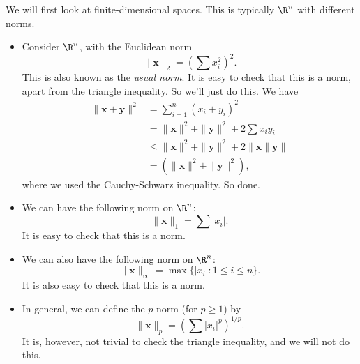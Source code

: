 \documentclass[a4paper]{article}
\begin{document}
\begin{eg}
  We will first look at finite-dimensional spaces. This is typically $\R^n$ with different norms.
  \begin{itemize}
    \item Consider $\R^n$, with the Euclidean norm
      \[
        \|\mathbf{x}\|_2 = \left(\sum x_i^2\right)^2.
      \]
      This is also known as the \emph{usual norm}. It is easy to check that this is a norm, apart from the triangle inequality. So we'll just do this. We have
      \begin{align*}
        \|\mathbf{x} + \mathbf{y}\|^2 &= \sum_{i = 1}^n (x_i + y_i)^2 \\
        &= \|\mathbf{x}\|^2 + \|\mathbf{y}\|^2 + 2\sum x_i y_i \\
        &\leq \|\mathbf{x}\|^2 + \|\mathbf{y}\|^2 + 2\|\mathbf{x}\|\mathbf{y}\| \\
        &= (\|\mathbf{x}\|^2 + \|\mathbf{y}\|^2),
      \end{align*}
      where we used the Cauchy-Schwarz inequality. So done.
    \item We can have the following norm on $\R^n$:
      \[
        \|\mathbf{x}\|_1 = \sum |x_i|.
      \]
      It is easy to check that this is a norm.
    \item We can also have the following norm on $\R^n$:
      \[
        \|\mathbf{x}\|_\infty = \max\{|x_i|: 1 \leq i \leq n\}.
      \]
      It is also easy to check that this is a norm.
    \item In general, we can define the $p$ norm (for $p \geq 1$) by
      \[
        \|\mathbf{x}\|_p = \left(\sum |x_i|^p\right)^{1/p}.
      \]
      It is, however, not trivial to check the triangle inequality, and we will not do this.


\end{itemize}
\end{eg}
\end{document}
